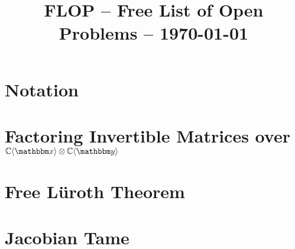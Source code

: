 \documentclass[letterpaper,reqno]{amsart}
\title{FLOP -- Free List of Open Problems -- \today}
\numberwithin{equation}{section}
\begin{document}
\maketitle

\tableofcontents


\section{Notation}







\section{Factoring Invertible Matrices over $\C\fralg{\bbx}\otimes \C\fralg{\bby}$}
	\label{sec:Elem_Mats}



\bigskip





\section{Free L{\"u}roth Theorem}
	\label{sec:Luroth}



\bigskip






\section{Jacobian Tame}
	\label{sec:Jac Tame}



\bigskip

\end{document}
